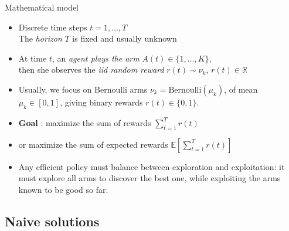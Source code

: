 \documentclass[11pt,english,ignorenonframetext,]{beamer}
\begin{document}
\begin{frame}{Mathematical model}

\begin{itemize}
  \item
  Discrete time steps $t = 1, \dots, T$\\
  The \emph{horizon} $T$ is fixed and usually unknown

  \item
  At time $t$, an \emph{agent plays the arm} $A(t)\in\{1,\dots,K\}$,\\
  then she observes the \emph{iid random reward} $r(t) \sim \nu_k$, $r(t)\in\mathbb{R}$

  \pause
  \item
  Usually, we focus on Bernoulli arms $\nu_k = \mathrm{Bernoulli}(\mu_k)$, of mean $\mu_k\in[0,1]$,
  giving binary rewards $r(t) \in\{0,1\}$.

  \pause
  \item
  \textbf{Goal} : maximize the sum of rewards $\sum\limits_{t=1}^T r(t)$

  \item
  or \alert{maximize the sum of expected rewards $\mathbb{E}\left[ \sum\limits_{t=1}^T r(t) \right]$}

  \pause
  \item
  Any efficient policy must balance \alert{between exploration and exploitation}:
  it must explore all arms to discover the best one,
  while exploiting the arms known to be good so far.
\end{itemize}

\end{frame}


\subsection{\hfill{}Naive solutions\hfill{}}
\end{document}
